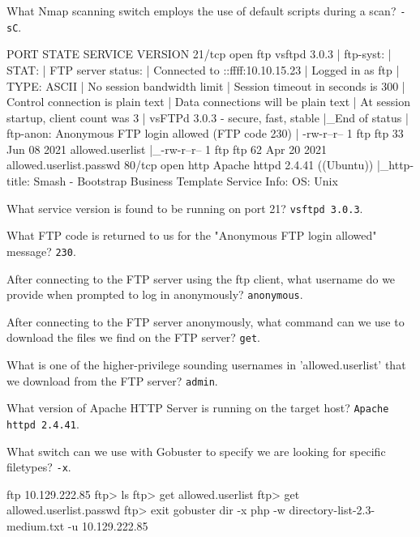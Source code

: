 \documentclass[a4paper,10pt]{article}
\begin{document}
What Nmap scanning switch employs the use of default scripts during a scan? \texttt{-sC}.
\begin{txt}
PORT   STATE SERVICE VERSION
21/tcp open  ftp     vsftpd 3.0.3
| ftp-syst:
|   STAT:
| FTP server status:
|      Connected to ::ffff:10.10.15.23
|      Logged in as ftp
|      TYPE: ASCII
|      No session bandwidth limit
|      Session timeout in seconds is 300
|      Control connection is plain text
|      Data connections will be plain text
|      At session startup, client count was 3
|      vsFTPd 3.0.3 - secure, fast, stable
|_End of status
| ftp-anon: Anonymous FTP login allowed (FTP code 230)
| -rw-r--r--    1 ftp      ftp            33 Jun 08  2021 allowed.userlist
|_-rw-r--r--    1 ftp      ftp            62 Apr 20  2021 allowed.userlist.passwd
80/tcp open  http    Apache httpd 2.4.41 ((Ubuntu))
|_http-title: Smash - Bootstrap Business Template
Service Info: OS: Unix
\end{txt}

What service version is found to be running on port 21? \texttt{vsftpd 3.0.3}.

What FTP code is returned to us for the "Anonymous FTP login allowed" message? \texttt{230}.

After connecting to the FTP server using the ftp client, what username do we provide when prompted to log in anonymously? \texttt{anonymous}.

After connecting to the FTP server anonymously, what command can we use to download the files we find on the FTP server? \texttt{get}.

What is one of the higher-privilege sounding usernames in 'allowed.userlist' that we download from the FTP server? \texttt{admin}.

What version of Apache HTTP Server is running on the target host? \texttt{Apache httpd 2.4.41}.

What switch can we use with Gobuster to specify we are looking for specific filetypes? \texttt{-x}.
\begin{bash}
ftp 10.129.222.85
ftp> ls
ftp> get allowed.userlist
ftp> get allowed.userlist.passwd
ftp> exit
gobuster dir -x php -w directory-list-2.3-medium.txt -u 10.129.222.85
\end{bash}
\end{document}
